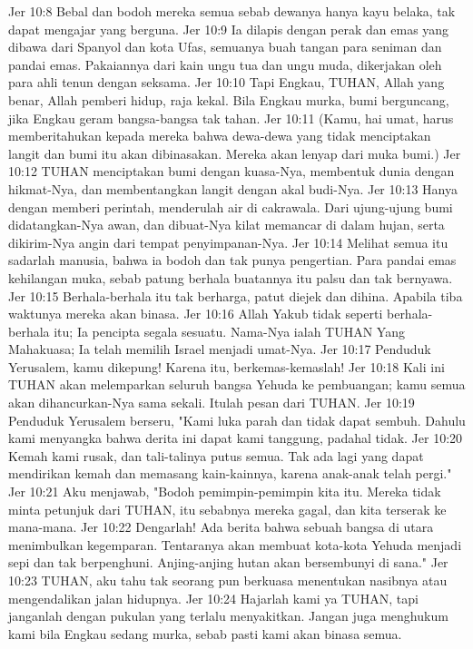 Jer 10:8  Bebal dan bodoh mereka semua sebab dewanya hanya kayu belaka, tak dapat mengajar yang berguna.
Jer 10:9  Ia dilapis dengan perak dan emas yang dibawa dari Spanyol dan kota Ufas, semuanya buah tangan para seniman dan pandai emas. Pakaiannya dari kain ungu tua dan ungu muda, dikerjakan oleh para ahli tenun dengan seksama.
Jer 10:10  Tapi Engkau, TUHAN, Allah yang benar, Allah pemberi hidup, raja kekal. Bila Engkau murka, bumi berguncang, jika Engkau geram bangsa-bangsa tak tahan.
Jer 10:11  (Kamu, hai umat, harus memberitahukan kepada mereka bahwa dewa-dewa yang tidak menciptakan langit dan bumi itu akan dibinasakan. Mereka akan lenyap dari muka bumi.)
Jer 10:12  TUHAN menciptakan bumi dengan kuasa-Nya, membentuk dunia dengan hikmat-Nya, dan membentangkan langit dengan akal budi-Nya.
Jer 10:13  Hanya dengan memberi perintah, menderulah air di cakrawala. Dari ujung-ujung bumi didatangkan-Nya awan, dan dibuat-Nya kilat memancar di dalam hujan, serta dikirim-Nya angin dari tempat penyimpanan-Nya.
Jer 10:14  Melihat semua itu sadarlah manusia, bahwa ia bodoh dan tak punya pengertian. Para pandai emas kehilangan muka, sebab patung berhala buatannya itu palsu dan tak bernyawa.
Jer 10:15  Berhala-berhala itu tak berharga, patut diejek dan dihina. Apabila tiba waktunya mereka akan binasa.
Jer 10:16  Allah Yakub tidak seperti berhala-berhala itu; Ia pencipta segala sesuatu. Nama-Nya ialah TUHAN Yang Mahakuasa; Ia telah memilih Israel menjadi umat-Nya.
Jer 10:17  Penduduk Yerusalem, kamu dikepung! Karena itu, berkemas-kemaslah!
Jer 10:18  Kali ini TUHAN akan melemparkan seluruh bangsa Yehuda ke pembuangan; kamu semua akan dihancurkan-Nya sama sekali. Itulah pesan dari TUHAN.
Jer 10:19  Penduduk Yerusalem berseru, "Kami luka parah dan tidak dapat sembuh. Dahulu kami menyangka bahwa derita ini dapat kami tanggung, padahal tidak.
Jer 10:20  Kemah kami rusak, dan tali-talinya putus semua. Tak ada lagi yang dapat mendirikan kemah dan memasang kain-kainnya, karena anak-anak telah pergi."
Jer 10:21  Aku menjawab, "Bodoh pemimpin-pemimpin kita itu. Mereka tidak minta petunjuk dari TUHAN, itu sebabnya mereka gagal, dan kita terserak ke mana-mana.
Jer 10:22  Dengarlah! Ada berita bahwa sebuah bangsa di utara menimbulkan kegemparan. Tentaranya akan membuat kota-kota Yehuda menjadi sepi dan tak berpenghuni. Anjing-anjing hutan akan bersembunyi di sana."
Jer 10:23  TUHAN, aku tahu tak seorang pun berkuasa menentukan nasibnya atau mengendalikan jalan hidupnya.
Jer 10:24  Hajarlah kami ya TUHAN, tapi janganlah dengan pukulan yang terlalu menyakitkan. Jangan juga menghukum kami bila Engkau sedang murka, sebab pasti kami akan binasa semua.
